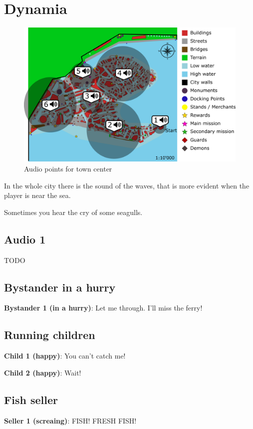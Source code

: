 \section{Dynamia}
\begin{figure}[H]
  \centering
  \includegraphics[width=\textwidth]{Images/Maps/dynamiaAudio}
  \caption{Audio points for town center}
\end{figure}

In the whole city there is the sound of the waves, that is more evident when the player is near the sea.

Sometimes you hear the cry of some seagulls.

\subsection{Audio 1}
TODO

\subsection{Bystander in a hurry}
\textbf{Bystander 1 (in a hurry)}: Let me through. I'll miss the ferry!

\subsection{Running children}
\textbf{Child 1 (happy)}: You can't catch me!

\textbf{Child 2 (happy)}: Wait!

\subsection{Fish seller}
\textbf{Seller 1 (screaing)}: FISH! FRESH FISH!

